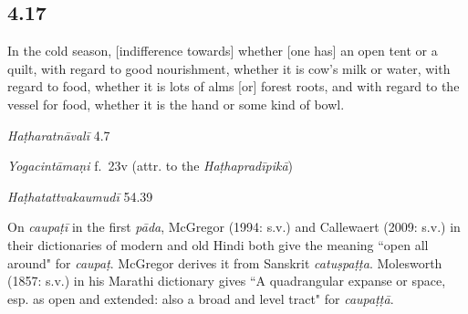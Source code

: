 \begin{ekdosis}
\subsection*{4.17}
\begin{translation}[hp04_017]
In the cold season, [indifference towards] whether [one has] an open tent or a quilt, with regard to good nourishment, whether it is cow's milk or water, with regard to food, whether it is lots of alms [or] forest roots, and with regard to the vessel for food, whether it is the hand or some kind of bowl.
\end{translation}



\begin{testimonia}[hp04_017]
\emph{Haṭharatnāvalī} 4.7
\begin{versinnote}
\end{versinnote}

\emph{Yogacintāmaṇi} f.~23v (attr. to the \emph{Haṭhapradīpikā})
\begin{versinnote}
\end{versinnote}

\emph{Haṭhatattvakaumudī}  54.39
\begin{versinnote}
\end{versinnote}

\end{testimonia}

\begin{philcomm}[hp04_017]
On \emph{caupaṭī} in the first \emph{pāda}, McGregor (1994: s.v.) and Callewaert (2009: s.v.) in their dictionaries of modern and old Hindi both give the meaning ``open all around" for \emph{caupaṭ}. McGregor derives it from Sanskrit \emph{catuṣpaṭṭa}. Molesworth (1857: s.v.) in his Marathi dictionary gives ``A quadrangular expanse or space, esp. as open and extended: also a broad and level tract" for \emph{caupaṭṭā}.
\end{philcomm}


\end{ekdosis}
